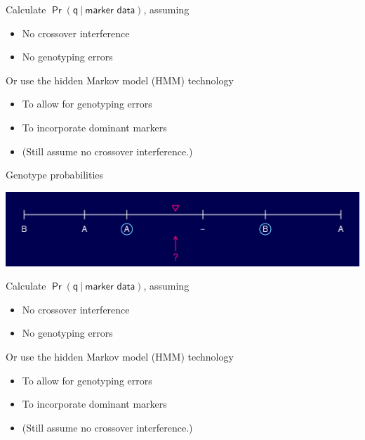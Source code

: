 \documentclass[12pt]{article}
\newcommand{\headsize}{\fontsize{35}{35} \selectfont}
\newcommand{\smallersize}{\fontsize{20}{25} \selectfont}
\begin{document}
\vspace{15mm}

\hfill
\begin{minipage}{10in}
\color{mywhite} \smallersize
Calculate {\color{myblue} $\mathsf{\Pr(q \ | \ \text{marker data})}$}, assuming
\begin{itemize}
\item No crossover interference
\item No genotyping errors
\end{itemize}

\vspace{10mm}

Or use the {\color{mypink} hidden Markov model (HMM)} technology
\begin{itemize}
\item To allow for genotyping errors
\item To incorporate dominant markers
\item {\color{myblue} (Still assume no crossover interference.)}
\end{itemize}
\end{minipage}


\newpage

\addtocounter{page}{-1}

\headsize \color{myyellow}
\hfill \begin{minipage}{5.75in}
\centering
Genotype probabilities
\end{minipage}

\vspace{15mm}

\centerline{\includegraphics{Figs/genoprob4.pdf}}

\vspace{15mm}

\hfill
\begin{minipage}{10in}
\color{mywhite} \smallersize
Calculate {\color{myblue} $\mathsf{\Pr(q \ | \ \text{marker data})}$}, assuming
\begin{itemize}
\item No crossover interference
\item No genotyping errors
\end{itemize}

\vspace{10mm}

Or use the {\color{mypink} hidden Markov model (HMM)} technology
\begin{itemize}
\item To allow for genotyping errors
\item To incorporate dominant markers
\item {\color{myblue} (Still assume no crossover interference.)}
\end{itemize}
\end{minipage}
\end{document}
